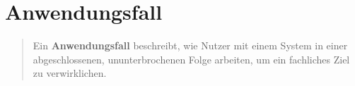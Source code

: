 \section{Anwendungsfall}

\begin{tcolorbox}[title=Anwendungsfall]
   \blockquote[{\cite[67, Hervorhebung eigene]{Wed09}}]{Ein \textbf{Anwendungsfall} beschreibt, wie Nutzer mit einem System in einer abgeschlossenen, ununterbrochenen Folge arbeiten, um ein fachliches Ziel zu verwirklichen.}
\end{tcolorbox}

